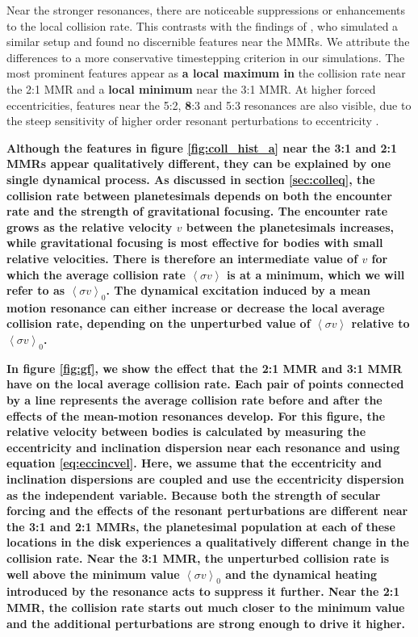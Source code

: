\documentclass[fleqn,usenatbib]{mnras}
\begin{document}
Near the stronger resonances, there are noticeable suppressions or enhancements to the local collision rate. This contrasts with the findings of 
\citet{2000Icar..143...45R}, who simulated a similar setup and found no discernible features near the MMRs. We attribute the differences to a more 
conservative timestepping criterion in our simulations. The most prominent features appear as \textbf{a local maximum in} the collision rate near the 2:1 
MMR and a \textbf{local minimum} near the 3:1 MMR. At higher forced eccentricities, features near the 5:2, \textbf{8}:3 and 5:3 resonances are also visible, due to the 
steep sensitivity of higher order resonant perturbations to eccentricity \citep{1994PhyD...77..289M}.

\textbf{Although the features in figure \ref{fig:coll_hist_a} near the 3:1 and 2:1 MMRs appear qualitatively different, they can be explained by one single dynamical process. As discussed in section \ref{sec:colleq}, the collision rate between planetesimals depends on both the encounter rate and the strength of gravitational focusing. The encounter rate grows as the relative velocity $v$ between the planetesimals increases, while gravitational focusing is most effective for bodies with small relative velocities. There is therefore an intermediate value of $v$ for which the average collision rate $\left< \sigma v \right>$ is at a minimum, which we will refer to as  $\left< \sigma v \right>_{0}$. The dynamical excitation induced by a mean motion resonance can either increase or decrease the local average collision rate, depending on the unperturbed value of  $\left< \sigma v \right>$ relative to  $\left< \sigma v \right>_{0}$.}

\textbf{In figure \ref{fig:gf}, we show the effect that the 2:1 MMR and 3:1 MMR have on the local average collision rate. Each pair of points connected by a line represents the average collision rate before and after the effects of the mean-motion resonances develop. For this figure, the relative velocity between bodies is calculated by measuring the eccentricity and inclination dispersion near each resonance and using equation \ref{eq:eccincvel}. Here, we assume that the eccentricity and inclination dispersions are coupled \citep{1993MNRAS.263..875I} and use the eccentricity dispersion as the independent variable. Because both the strength of secular forcing and the effects of the resonant perturbations are different near the 3:1 and 2:1 MMRs, the planetesimal population at each of these locations in the disk experiences a qualitatively different change in the collision rate. Near the 3:1 MMR, the unperturbed collision rate is well above the minimum value $\left< \sigma v \right>_{0}$ and the dynamical heating introduced by the resonance acts to suppress it further. Near the 2:1 MMR, the collision rate starts out much closer to the minimum value and the additional perturbations are strong enough to drive it higher.}
\end{document}
